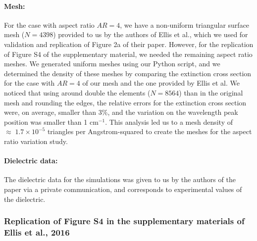 \paragraph{Mesh:}
For the case with aspect ratio $AR=4$, we have a non-uniform triangular surface mesh ($N=4398$) provided to us by the authors of 
Ellis et al., which we used for validation and replication of Figure 2a of their paper. However, for the replication
of Figure S4 of the supplementary material, we needed the remaining aspect ratio meshes. We generated uniform meshes using our
Python script, and we determined the density of these meshes by comparing the extinction cross section for the case with $AR=4$ of 
our mesh and the one provided by Ellis et al. We noticed that using around double the elements ($N=8564$) than in the original mesh and 
rounding the edges, the relative errors for the extinction cross section were, on average, smaller than 3$\%$, and the variation on the wavelength peak
position was smaller than 1 cm$^{-1}$. This analysis led us to a mesh density of $\approx \; 1.7 \times10^{-5}$ triangles per Angstrom-squared to create the meshes for 
the aspect ratio variation study.


\paragraph{Dielectric data:}
The dielectric data for the simulations was given to us by the authors of the paper via a private communication, 
and corresponds to experimental values of the dielectric. 

\subsubsection{Replication of Figure S4 in the supplementary materials of Ellis et al., 2016}

